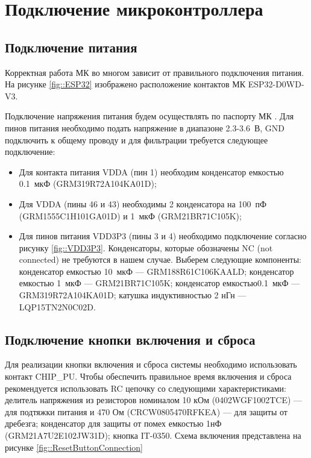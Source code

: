\section {Подключение микроконтроллера}

\subsection {Подключение питания}

Корректная работа МК во многом зависит от правильного подключения питания. На рисунке \ref{fig::ESP32}
изображено расположение контактов МК ESP32-D0WD-V3.


Подключение напряжения питания будем осуществлять по паспорту МК \cite{datasheet::ESP32}. Для пинов питания необходимо подать напряжение в диапазоне 2.3-3.6~В, GND подключить к общему проводу и для фильтрации требуется следующее подключение: 

\begin{itemize}

	\item Для контакта питания VDDA (пин 1) необходим конденсатор емкостью 0.1~мкФ (GRM319R72A104KA01D);
	
	\item Для VDDA (пины 46 и 43) необходимы 2 конденсатора на 100~пФ (GRM1555C1H101GA01D) и 1~мкФ (GRM21BR71C105K);
	
	\item Для пинов питания VDD3P3 (пины 3 и 4) необходимо подключение согласно рисунку \ref{fig::VDD3P3}. Конденсаторы, которые обозначены NC (not connected) не требуются в нашем случае. Выберем следующие компоненты: конденсатор емкостью 10~мкФ --- GRM188R61C106KAALD; конденсатор емкостью 1~мкФ --- GRM21BR71C105K; конденсатор емкостью0.1~мкФ --- GRM319R72A104KA01D; катушка индуктивностью 2 нГн --- LQP15TN2N0C02D.

\end{itemize}


\subsection{Подключение кнопки включения и сброса}

Для реализации кнопки включения и сброса системы необходимо использовать контакт CHIP\_PU. Чтобы обеспечить правильное время включения и сброса рекомендуется использовать RC цепочку со следующими характеристиками: делитель напряжения из резисторов номиналом 10 кОм (0402WGF1002TCE) --- для подтяжки питания и 470 Ом (CRCW0805470RFKEA) --- для защиты от дребезга; конденсатор для защиты от помех емкостью 1нФ (GRM21A7U2E102JW31D); кнопка IT-0350. Схема включения представлена на рисунке \ref{fig::ResetButtonConnection} 

